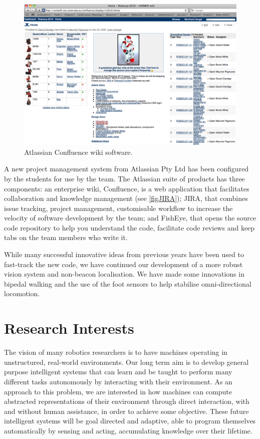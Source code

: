 \documentclass[pdftex,11pt,a4paper]{report}
\begin{document}
\begin{figure} [t]
\centering
\includegraphics[width=1.0\textwidth]{figures/JIRA}
\caption{Atlassian Confluence wiki software.} \label{figJIRA}
\end{figure}

A new project management system from Atlassian Pty Ltd has been configured by the students for use by the team. The Atlassian suite of products has three components: an enterprise wiki, Confluence, is a web application that facilitates collaboration and knowledge management (see \autoref{figJIRA}); JIRA, that combines issue tracking, project management, customisable workflow to increase the velocity of software development by the team; and FishEye, that opens the source code repository to help you understand the code, facilitate code reviews and keep tabs on the team members who write it.

While many successful innovative ideas from previous years have been used to fast-track the new code, we have continued our development of a more robust vision system and non-beacon localisation. We have made some innovations in bipedal walking and the use of the foot sensors to help stabilise omni-directional locomotion. 

\section{Research Interests}

The vision of many robotics researchers is to have machines operating in unstructured, real-world environments. Our long term aim is to develop general purpose intelligent systems that can learn and be taught to perform many different tasks autonomously by interacting with their environment. As an approach to this problem, we are interested in how machines can compute abstracted representations of their environment through direct interaction, with and without human assistance, in order to achieve some objective. These future intelligent systems will be goal directed and adaptive, able to program themselves automatically by sensing and acting, accumulating knowledge over their lifetime.  
\end{document}
